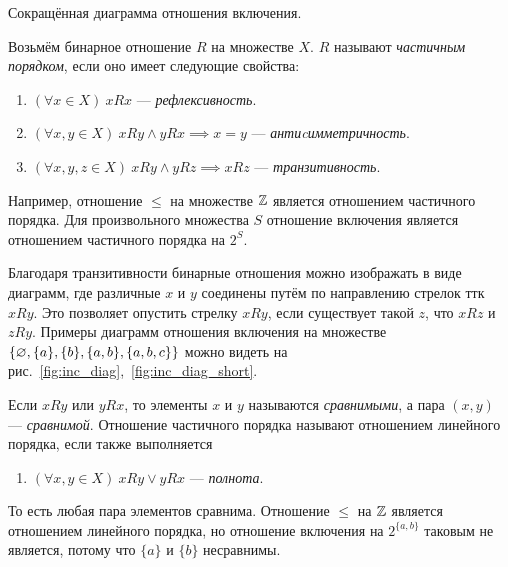 \begin{marginfigure}
	\center

	\caption{Сокращённая диаграмма отношения включения.}\label{fig:inc_diag_short}
\end{marginfigure}

Возьмём бинарное отношение $R$ на множестве $X$. $R$ называют {\it частичным порядком},
если оно имеет следующие свойства:
\begin{enumerate}
	\item{}$(\forall x\in X)~xRx$ --- {\it рефлексивность}.
	\item{}$(\forall x,y\in X)~xRy\land yRx\implies x=y$ --- {\it антиcимметричность}.
	\item{}$(\forall x,y,z\in X)~xRy\land yRz\implies xRz$ --- {\it транзитивность}.
\end{enumerate}
Например, отношение $\leq$ на множестве $\mathbb Z$ является отношением частичного порядка.
Для произвольного множества $S$ отношение включения является
отношением частичного порядка на $2^{S}$.

Благодаря транзитивности бинарные отношения можно изображать в виде диаграмм, где
различные $x$ и $y$ соединены путём по направлению стрелок ттк $xRy$.
Это позволяет опустить стрелку $xRy$, если существует такой $z$, что $xRz$ и $zRy$.
Примеры диаграмм отношения включения на множестве
$\{\varnothing,\{a\},\{b\},\{a,b\}, \{a,b,c\}\}$
можно видеть на рис.~\ref{fig:inc_diag},~\ref{fig:inc_diag_short}.

Если $xRy$ или $yRx$, то элементы $x$ и $y$ называются {\it сравнимыми},
а пара $(x,y)$ --- {\it сравнимой}.
Отношение частичного порядка называют отношением линейного порядка,
если также выполняется
\begin{enumerate}[resume*]
	\item{}$(\forall x,y\in X)~xRy\lor yRx$ --- {\it полнота}.
\end{enumerate}
То есть любая пара элементов сравнима. Отношение $\leq$ на $\mathbb Z$
является отношением линейного порядка,
но отношение включения на $2^{\{a,b\}}$ таковым не является,
потому что $\{a\}$ и $\{b\}$ несравнимы.

